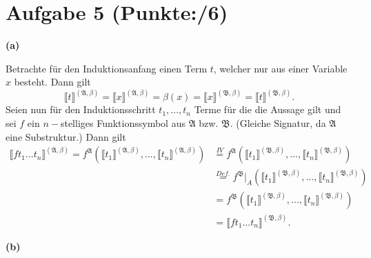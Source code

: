 \documentclass[11pt, a4paper]{article}
\newcommand{\pppp}{6}
\begin{document}
\section*{Aufgabe 5 (Punkte:\qquad/\pppp)}
\textbf{(a)}
\begin{adjustwidth}{20pt}{20pt}
	Betrachte für den Induktionsanfang einen Term $t$, welcher nur aus einer Variable $x$ besteht. Dann gilt
	\[
	\llbracket t \rrbracket^{(\mathfrak{A},\beta)} =
	\llbracket x \rrbracket^{(\mathfrak{A},\beta)} = \beta(x) = \llbracket x \rrbracket^{(\mathfrak{B},\beta)} = \llbracket t \rrbracket^{(\mathfrak{B},\beta)}.
	\]
	Seien nun für den Induktionsschritt $t_1,...,t_n$ Terme für die die Aussage gilt und sei $f$ ein $n-$stelliges Funktionssymbol aus $\mathfrak{A}$ bzw. $\mathfrak{B}$. (Gleiche Signatur, da
	$\mathfrak{A}$ eine Substruktur.) Dann gilt
	\begin{align*}
	\llbracket ft_1...t_n \rrbracket^{(\mathfrak{A},\beta)} = f^{\mathfrak{A}}(\llbracket t_1 \rrbracket^{(\mathfrak{A},\beta)},...,\llbracket t_n\rrbracket^{(\mathfrak{A},\beta)})
	& \overset{IV}{=} f^{\mathfrak{A}}(\llbracket t_1 \rrbracket^{(\mathfrak{B},\beta)},...,\llbracket t_n\rrbracket^{(\mathfrak{B},\beta)}) \\
	& \overset{Def.}{=} f^{\mathfrak{B}}|_A(\llbracket t_1 \rrbracket^{(\mathfrak{B},\beta)},...,\llbracket t_n\rrbracket^{(\mathfrak{B},\beta)}) \\
	& = f^{\mathfrak{B}}(\llbracket t_1 \rrbracket^{(\mathfrak{B},\beta)},...,\llbracket t_n\rrbracket^{(\mathfrak{B},\beta)}) \\
	& = \llbracket ft_1...t_n \rrbracket^{(\mathfrak{B},\beta)}.
	\end{align*}
\end{adjustwidth}
\textbf{(b)}
\end{document}
